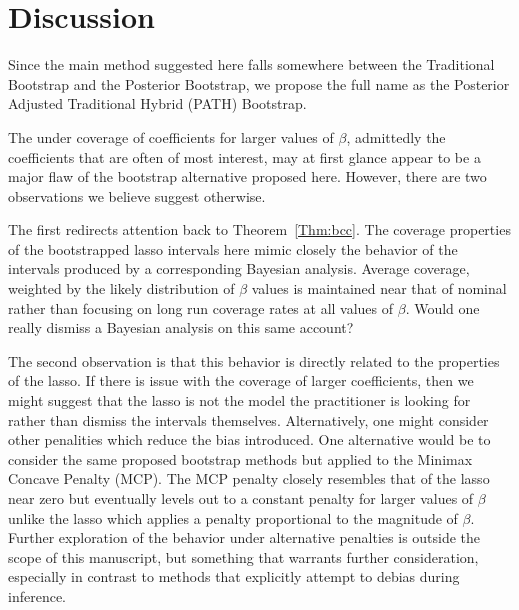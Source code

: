 \section{Discussion}

Since the main method suggested here falls somewhere between the Traditional Bootstrap and the Posterior Bootstrap, we propose the full name as the Posterior Adjusted Traditional Hybrid (PATH) Bootstrap.

The under coverage of coefficients for larger values of $\beta$, admittedly the coefficients that are often of most interest, may at first glance appear to be a major flaw of the bootstrap alternative proposed here. However, there are two observations we believe suggest otherwise.

The first redirects attention back to Theorem~\ref{Thm:bcc}. The coverage properties of the bootstrapped lasso intervals here mimic closely the behavior of the intervals produced by a corresponding Bayesian analysis. Average coverage, weighted by the likely distribution of $\beta$ values is maintained near that of nominal rather than focusing on long run coverage rates at all values of $\beta$. Would one really dismiss a Bayesian analysis on this same account? 

The second observation is that this behavior is directly related to the properties of the lasso. If there is issue with the coverage of larger coefficients, then we might suggest that the lasso is not the model the practitioner is looking for rather than dismiss the intervals themselves. Alternatively, one might consider other penalities which reduce the bias introduced. One alternative would be to consider the same proposed bootstrap methods but applied to the Minimax Concave Penalty (MCP). The MCP penalty closely resembles that of the lasso near zero but eventually levels out to a constant penalty for larger values of $\beta$ unlike the lasso which applies a penalty proportional to the magnitude of $\beta$. Further exploration of the behavior under alternative penalties is outside the scope of this manuscript, but something that warrants further consideration, especially in contrast to methods that explicitly attempt to debias during inference.


